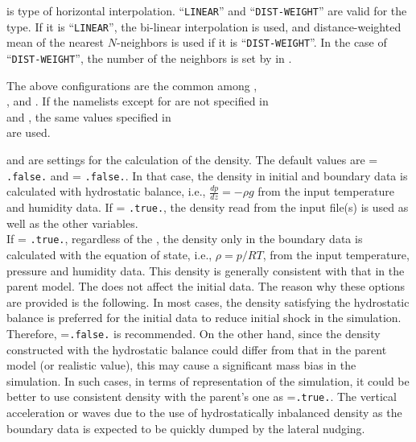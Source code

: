  is type of horizontal interpolation.
``\verb|LINEAR|'' and ``\verb|DIST-WEIGHT|'' are valid for the type.
If it is ``\verb|LINEAR|'', the bi-linear interpolation is used, and distance-weighted mean of the nearest $N$-neighbors is used if it is ``\verb|DIST-WEIGHT|''.
In the case of ``\verb|DIST-WEIGHT|'', the number of the neighbors is set by  in .

The above configurations are the common among ,\\ , and .
If the namelists except for  are not specified in\\  and , the same values specified in\\  are used.


 and  are settings for the calculation of the density.
The default values are  = \verb|.false.| and  = \verb|.false.|.
In that case, the density in initial and boundary data is calculated with hydrostatic balance, i.e., $\frac{dp}{dz}=-\rho g$ from the input temperature and humidity data.
If  = \verb|.true.|, the density read from the input file(s) is used as well as the other variables.\\
If  = \verb|.true.|, regardless of the , the density only in the boundary data is calculated with the equation of state, i.e., $\rho = p/RT$,  from the input temperature, pressure and humidity data.
This density is generally consistent with that in the parent model.
The  does not affect the initial data.
The reason why these options are provided is the following.
In most cases, the density satisfying the hydrostatic balance is preferred for the initial data to reduce initial shock in the simulation.
Therefore, =\verb|.false.| is recommended.
On the other hand, since the density constructed with the hydrostatic balance could differ from that in the parent model (or realistic value), this may cause a significant mass bias in the simulation.
In such cases, in terms of representation of the simulation, it could be better to use consistent density with the parent's one as =\verb|.true.|.
The vertical acceleration or waves due to the use of hydrostatically inbalanced density as the boundary data is expected to be quickly dumped by the lateral nudging.


